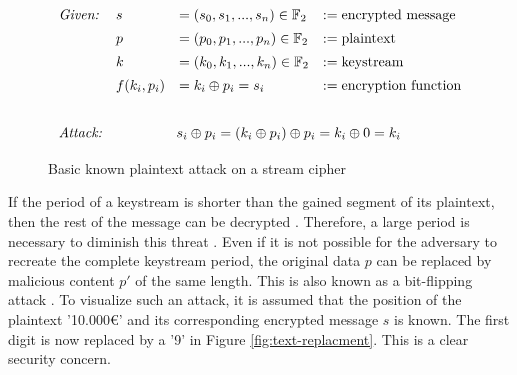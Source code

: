 \begin{figure}[htpb]
	\[\def\arraystretch{1.4}\begin{array}{llll}
		\text{\it{Given:}}& s &= (s_0, s_1, ..., s_n) \in \mathbb{F}_2 &:= \text{encrypted\ message}\\
		&p &= (p_0, p_1, ..., p_n) \in \mathbb{F}_2 &:= \text{plaintext}\\
		&k &= (k_0, k_1, ..., k_n) \in \mathbb{F}_2 &:= \text{keystream}\\
		&f(k_i, p_i) &= k_i \oplus p_i = s_i &:= \text{encryption function}\vspace{0,6cm}\\
		
		\text{\it{Attack:}}& \multicolumn{3}{c}{s_i \oplus p_i = (k_i \oplus p_i) \oplus p_i = k_i \oplus 0 = k_i}\\
	\end{array}\]
	\caption{Basic known plaintext attack on a stream cipher}
	\label{fig:known-plaintext}
\end{figure}

If the period of a keystream is shorter than the gained segment of its plaintext, then the rest of the message can be decrypted \cite[p. 9]{Rueppel.1986}. Therefore, a large period is necessary to diminish this threat \cite[p. 83]{Stamp.2007}. Even if it is not possible for the adversary to recreate the complete keystream period, the original data $p$ can be replaced by malicious content $p'$ of the same length. This is also known as a bit-flipping attack \cite[p. 6]{graves2010ceh}. To visualize such an attack, it is assumed that the position of the plaintext '10.000€' and its corresponding encrypted message $s$ is known. The first digit is now replaced by a '9' in Figure \ref{fig:text-replacment}. This is a clear security concern.

